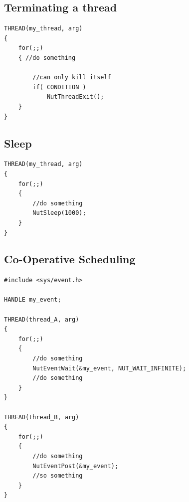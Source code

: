 \subsection{Terminating a thread}

\begin{lstlisting}[basicstyle=\tiny]
THREAD(my_thread, arg)
{
	for(;;)
	{ //do something 
	
		//can only kill itself
		if( CONDITION )
			NutThreadExit();
	}
}
\end{lstlisting}


\subsection{Sleep}


\begin{lstlisting}[basicstyle=\tiny]
THREAD(my_thread, arg)
{
	for(;;)
	{
		//do something 
		NutSleep(1000);
	}
}
\end{lstlisting}

\subsection{Co-Operative Scheduling}


\begin{lstlisting}[basicstyle=\tiny]
#include <sys/event.h>

HANDLE my_event;

THREAD(thread_A, arg)
{
	for(;;)
	{
		//do something 
		NutEventWait(&my_event, NUT_WAIT_INFINITE);
		//do something
	}
}

THREAD(thread_B, arg)
{
	for(;;)
	{
		//do something
		NutEventPost(&my_event);
		//so something
	}
}
\end{lstlisting}



\cleardoublepage
